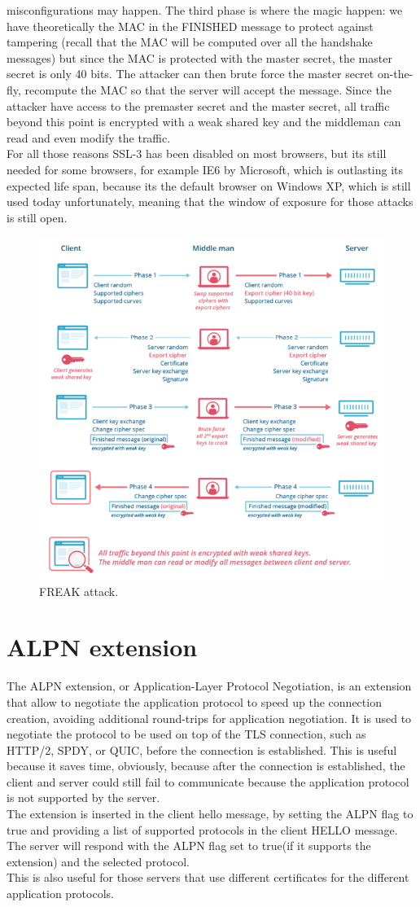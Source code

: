 misconfigurations may happen. The third phase is where the magic
happen: we have theoretically the MAC  in the FINISHED message to
protect against tampering (recall that the MAC will be computed over
all the handshake messages) but since the MAC is protected with the
master secret, the master secret is only 40 bits. The attacker can
then brute force the master secret on-the-fly, recompute the MAC so
that the server will accept the message. Since the attacker have
access to the premaster secret and the master secret, all traffic
beyond this point is encrypted with a weak shared key and the
middleman can read and even modify the traffic.\\
For all those reasons SSL-3 has been disabled on most browsers, but
its still needed for some browsers, for example IE6 by Microsoft,
which is outlasting its expected life span, because its the default
browser on Windows XP, which is still used today unfortunately,
meaning that the window of exposure for those attacks is still open.

\begin{figure}[H]
  \centering
  \includegraphics[width=.6\textwidth]{img/FREAK attack.png}
  \caption{FREAK attack.}
  \label{fig:freak-attack}
\end{figure}

\section{ALPN extension}
The ALPN extension, or Application-Layer Protocol Negotiation, is an
extension that allow to negotiate the application protocol to speed up
the connection creation, avoiding additional round-trips for
application negotiation. It is used to negotiate the protocol to be 
used on top of the TLS connection, such as HTTP/2, SPDY, or QUIC,
before the connection is established. This is useful because it saves
time, obviously, because after the connection is established, the
client and server could still fail to communicate because the
application protocol is not supported by the server.\\
The extension is inserted in the client hello message, by setting the
ALPN flag to true and providing a list of supported protocols in the
client HELLO message. The server will respond with the ALPN flag set
to true(if it supports the extension) and the selected protocol.\\
This is also useful for those servers that use different certificates
for the different application protocols.

